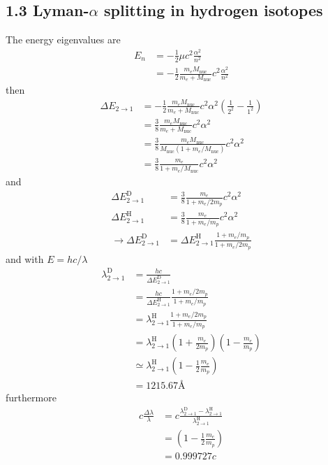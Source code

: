 \documentclass[10pt,a4paper]{book}
\theoremstyle{definition}
\begin{document}
\subsection{1.3 Lyman-$\alpha$ splitting in hydrogen isotopes}
The energy eigenvalues are
\begin{align}
E_n
&=-\frac{1}{2}\mu c^2\frac{\alpha^2}{n^2}\\
&=-\frac{1}{2}\frac{m_eM_\text{nuc}}{m_e+M_\text{nuc}} c^2\frac{\alpha^2}{n^2}
\end{align}
then
\begin{align}
\Delta E_{2\rightarrow1}
&=-\frac{1}{2}\frac{m_eM_\text{nuc}}{m_e+M_\text{nuc}} c^2\alpha^2\left(\frac{1}{2^2}-\frac{1}{1^2}\right)\\
&=\frac{3}{8}\frac{m_eM_\text{nuc}}{m_e+M_\text{nuc}} c^2\alpha^2\\
&=\frac{3}{8}\frac{m_eM_\text{nuc}}{M_\text{nuc}(1+m_e/M_\text{nuc})} c^2\alpha^2\\
&=\frac{3}{8}\frac{m_e}{1+m_e/M_\text{nuc}} c^2\alpha^2
\end{align}
and
\begin{align}
\Delta E^\text{D}_{2\rightarrow1}
&=\frac{3}{8}\frac{m_e}{1+m_e/2m_p} c^2\alpha^2\\
\Delta E^\text{H}_{2\rightarrow1}
&=\frac{3}{8}\frac{m_e}{1+m_e/m_p} c^2\alpha^2\\
\rightarrow \Delta E^\text{D}_{2\rightarrow1}&= \Delta E^\text{H}_{2\rightarrow1}\frac{1+m_e/m_p}{1+m_e/2m_p}
\end{align}
and with $E=hc/\lambda$
\begin{align}
\lambda^\text{D}_{2\rightarrow1}&=\frac{hc}{\Delta E^\text{D}_{2\rightarrow1}}\\
&=\frac{hc}{\Delta E^\text{H}_{2\rightarrow1}}\frac{1+m_e/2m_p}{1+m_e/m_p}\\
&=\lambda^\text{H}_{2\rightarrow1}\frac{1+m_e/2m_p}{1+m_e/m_p}\\
&=\lambda^\text{H}_{2\rightarrow1}\left(1+\frac{m_e}{2m_p}\right)\left(1-\frac{m_e}{m_p}\right)\\
&\simeq\lambda^\text{H}_{2\rightarrow1}\left(1-\frac{1}{2}\frac{m_e}{m_p}\right)\\
&=1215.67\text{\AA}
\end{align}
furthermore
\begin{align}
c\frac{\Delta\lambda}{\lambda}&=
c\frac{\lambda^\text{D}_{2\rightarrow1}-\lambda^\text{H}_{2\rightarrow1}}{\lambda^\text{H}_{2\rightarrow1}}\\
&=\left(1-\frac{1}{2}\frac{m_e}{m_p}\right)\\
&=0.999727c
\end{align}
\end{document}

